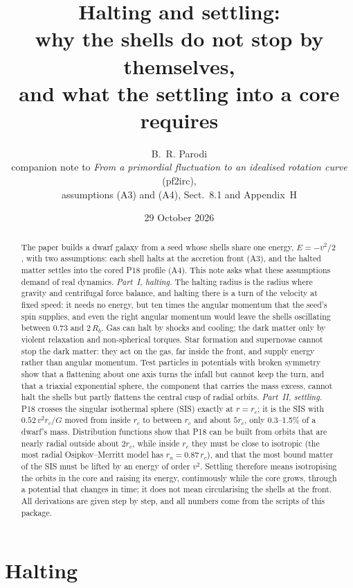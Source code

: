 \documentclass[11pt,a4paper]{article}
\title{Halting and settling:\\ why the shells do not stop by themselves,\\ and what
the settling into a core requires}
\author{B.~R. Parodi\\[2pt]\small companion note to \emph{From a primordial
fluctuation to an idealised rotation curve} (pf2irc),\\ \small assumptions (A3) and
(A4), Sect.~8.1 and Appendix~H}
\date{29 October 2026}
\newcommand{\rc}{r_c}
\newcommand{\Rb}{R_b}
\begin{document}
\maketitle

\begin{abstract}
\noindent The paper builds a dwarf galaxy from a seed whose shells share one energy,
$E=-v^2/2$, with two assumptions: each shell halts at the accretion front (A3), and
the halted matter settles into the cored P18 profile (A4). This note asks what these
assumptions demand of real dynamics. \emph{Part~I, halting.} The halting radius is the
radius where gravity and centrifugal force balance, and halting there is a turn of
the velocity at fixed speed: it needs no energy, but ten times the angular momentum
that the seed's spin supplies, and even the right angular momentum would leave the
shells oscillating between $0.73$ and $2\,\Rb$. Gas can halt by shocks and cooling;
the dark matter only by violent relaxation and non-spherical torques. Star formation
and supernovae cannot stop the dark matter: they act on the gas, far inside the
front, and supply energy rather than angular momentum. Test particles in potentials
with broken symmetry show that a flattening about one axis turns the infall but
cannot keep the turn, and that a triaxial exponential sphere, the component that
carries the mass excess, cannot halt the shells but partly flattens the central cusp
of radial orbits. \emph{Part~II, settling.} P18 crosses the singular isothermal
sphere (SIS) exactly at $r=\rc$; it is the SIS with $0.52\,v^2\rc/G$ moved from
inside $\rc$ to between $\rc$ and about $5\rc$, only 0.3--1.5\% of a dwarf's mass.
Distribution functions show that P18 can be built from orbits that are nearly radial
outside about $2\rc$, while inside $\rc$ they must be close to isotropic (the most
radial Osipkov--Merritt model has $r_a=0.87\,\rc$), and that the most bound matter of
the SIS must be lifted by an energy of order $v^2$. Settling therefore means
isotropising the orbits in the core and raising its energy, continuously while the
core grows, through a potential that changes in time; it does not mean
circularising the shells at the front. All derivations are given step by step, and
all numbers come from the scripts of this package.
\end{abstract}

\tableofcontents
\bigskip

\part{Halting}
\end{document}
